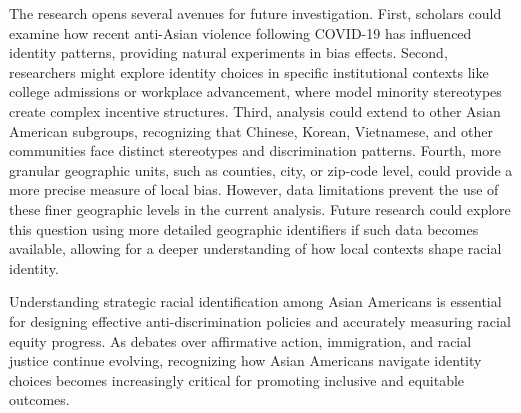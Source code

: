The research opens several avenues for future investigation. First, scholars could examine how recent anti-Asian violence following COVID-19 has influenced identity patterns, providing natural experiments in bias effects. Second, researchers might explore identity choices in specific institutional contexts like college admissions or workplace advancement, where model minority stereotypes create complex incentive structures. Third, analysis could extend to other Asian American subgroups, recognizing that Chinese, Korean, Vietnamese, and other communities face distinct stereotypes and discrimination patterns. Fourth, more granular geographic units, such as counties, city, or zip-code level, could provide a more precise measure of local bias. However, data limitations prevent the use of these finer geographic levels in the current analysis. Future research could explore this question using more detailed geographic identifiers if such data becomes available, allowing for a deeper understanding of how local contexts shape racial identity.

Understanding strategic racial identification among Asian Americans is essential for designing effective anti-discrimination policies and accurately measuring racial equity progress. As debates over affirmative action, immigration, and racial justice continue evolving, recognizing how Asian Americans navigate identity choices becomes increasingly critical for promoting inclusive and equitable outcomes.
